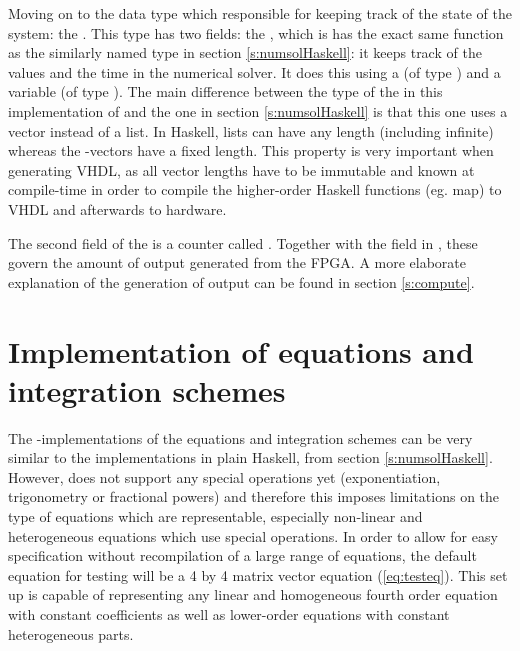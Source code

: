 Moving on to the data type which responsible for keeping track of the state of the system: the . This type has two fields: the , which is has the exact same function as the similarly named type in section \ref{s:numsolHaskell}: it keeps track of the values and the time in the numerical solver. It does this using a  (of type ) and a  variable (of type ). The main difference between the type of the  in this implementation of  and the one in section \ref{s:numsolHaskell} is that this one uses a vector instead of a list. In Haskell, lists can have any length (including infinite) whereas the \clash{}-vectors have a fixed length. This property is very important when generating VHDL, as all vector lengths have to be immutable and known at compile-time in order to compile the higher-order Haskell functions (eg. map) to VHDL and afterwards to hardware. 

The second field of the  is a counter called . Together with the  field in , these govern the amount of output generated from the FPGA. A more elaborate explanation of the generation of output can be found in section \ref{s:compute}.



\section{Implementation of equations and integration schemes}
The \clash{}-implementations of the equations and integration schemes can be very similar to the implementations in plain Haskell, from section \ref{s:numsolHaskell}. However, \clash{} does not support any special operations yet (exponentiation, trigonometry or fractional powers) and therefore this imposes limitations on the type of equations which are representable, especially non-linear and heterogeneous equations which use special operations. In order to allow for easy specification without recompilation of a large range of equations, the default equation for testing will be a 4 by 4 matrix vector equation (\ref{eq:testeq}). This set up is capable of representing any linear and homogeneous fourth order equation with constant coefficients as well as lower-order equations with constant heterogeneous parts.

